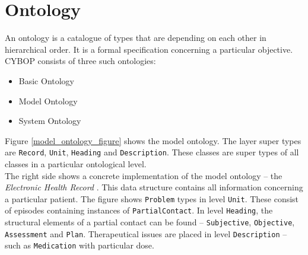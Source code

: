 %
%
%
%
%
%
%

\section{Ontology}
\label{ontology_heading}

An ontology is a catalogue of types that are depending on each other in hierarchical
order. It is a formal specification concerning a particular objective. CYBOP
consists of three such ontologies:
\begin{itemize}
    \item{Basic Ontology}
    \item{Model Ontology}
    \item{System Ontology}
\end{itemize}

Figure \ref{model_ontology_figure} shows the model ontology. The layer super types
are {\tt Record}, {\tt Unit}, {\tt Heading} and {\tt Description}. These classes
are super types of all classes in a particular ontological level.\\
The right side shows a concrete implementation of the model ontology -- the
\emph{Electronic Health Record} \cite{openehr}. This data structure contains all
information concerning a particular patient. The figure shows {\tt Problem} types
in level {\tt Unit}. These consist of episodes containing instances of
{\tt PartialContact}. In level {\tt Heading}, the structural elements of a partial
contact can be found -- {\tt Subjective}, {\tt Objective}, {\tt Assessment} and
{\tt Plan}. Therapeutical issues are placed in level {\tt Description} -- such as
{\tt Medication} with particular dose.

